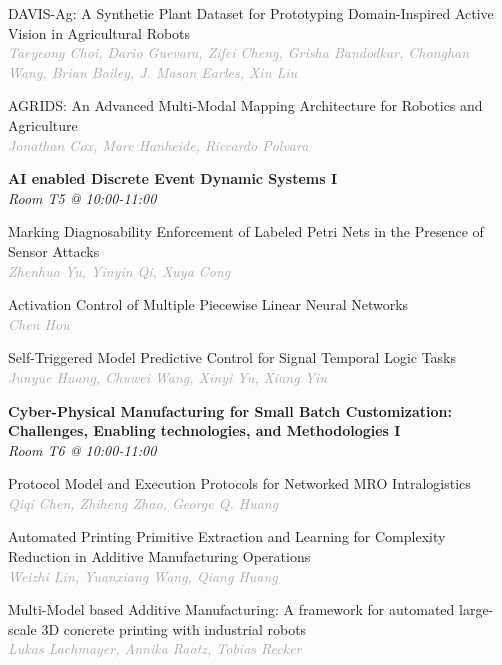 \begin{multicols*}{2}
\small DAVIS-Ag: A Synthetic Plant Dataset for Prototyping Domain-Inspired Active Vision in Agricultural Robots\\ 
\footnotesize \textcolor{darkgray}{\textit{Taeyeong Choi, Dario  Guevara, Zifei  Cheng, Grisha  Bandodkar, Chonghan  Wang, Brian  Bailey, J. Mason  Earles, Xin  Liu}}

\small AGRIDS: An Advanced Multi-Modal Mapping Architecture for Robotics and Agriculture\\ 
\footnotesize \textcolor{darkgray}{\textit{Jonathan Cox, Marc  Hanheide, Riccardo  Polvara}}

\normalsize \textbf{AI enabled Discrete Event Dynamic Systems I}\\
\small \textit{Room T5 @ 10:00-11:00}

\small Marking Diagnosability Enforcement of Labeled Petri Nets in the Presence of Sensor Attacks\\ 
\footnotesize \textcolor{darkgray}{\textit{Zhenhua Yu, Yinyin  Qi, Xuya  Cong}}

\small Activation Control of Multiple Piecewise Linear Neural Networks\\ 
\footnotesize \textcolor{darkgray}{\textit{Chen Hou}}

\small Self-Triggered Model Predictive Control for Signal Temporal Logic Tasks\\ 
\footnotesize \textcolor{darkgray}{\textit{Junyue Huang, Chuwei  Wang, Xinyi  Yu, Xiang  Yin}}

\normalsize \textbf{Cyber-Physical Manufacturing for Small Batch Customization: Challenges, Enabling technologies, and Methodologies I}\\
\small \textit{Room T6 @ 10:00-11:00}

\small Protocol Model and Execution Protocols for Networked MRO Intralogistics\\ 
\footnotesize \textcolor{darkgray}{\textit{Qiqi Chen, Zhiheng  Zhao, George Q.  Huang}}

\small Automated Printing Primitive Extraction and Learning for Complexity Reduction in Additive Manufacturing Operations\\ 
\footnotesize \textcolor{darkgray}{\textit{Weizhi Lin, Yuanxiang  Wang, Qiang  Huang}}

\small Multi-Model based Additive Manufacturing: A framework for automated large-scale 3D concrete printing with industrial robots\\ 
\footnotesize \textcolor{darkgray}{\textit{Lukas Lachmayer, Annika  Raatz, Tobias  Recker}}


\end{multicols*}
